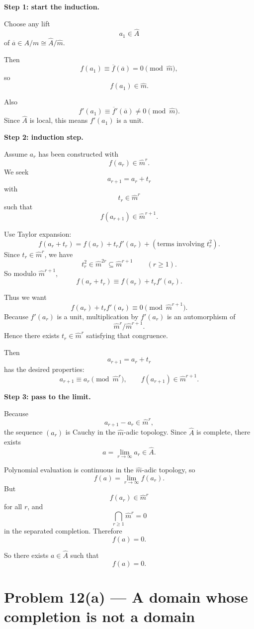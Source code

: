 \documentclass[12pt,a4paper]{article}
\theoremstyle{plain}
\theoremstyle{definition}      %
\begin{document}
	\medskip
	\textbf{Step 1: start the induction.}
	
	Choose any lift
	\[
	a_1\in \widehat A
	\]
	of \(\overline a\in A/m\cong \widehat A/\widehat m\).
	
	Then
	\[
	f(a_1)\equiv \overline f(\overline a)=0 \pmod{\widehat m},
	\]
	so
	\[
	f(a_1)\in \widehat m.
	\]
	
	Also
	\[
	f'(a_1)\equiv \overline f'(\overline a)\neq 0 \pmod{\widehat m}.
	\]
	Since \(\widehat A\) is local, this means \(f'(a_1)\) is a unit.
	
	\medskip
	\textbf{Step 2: induction step.}
	
	Assume \(a_r\) has been constructed with
	\[
	f(a_r)\in \widehat m^r.
	\]
	We seek
	\[
	a_{r+1}=a_r+t_r
	\]
	with
	\[
	t_r\in \widehat m^r
	\]
	such that
	\[
	f(a_{r+1})\in \widehat m^{r+1}.
	\]
	
	Use Taylor expansion:
	\[
	f(a_r+t_r)=f(a_r)+t_r f'(a_r)+(\text{terms involving }t_r^2).
	\]
	Since \(t_r\in \widehat m^r\), we have
	\[
	t_r^2\in \widehat m^{2r}\subseteq \widehat m^{r+1}
	\qquad (r\ge 1).
	\]
	So modulo \(\widehat m^{r+1}\),
	\[
	f(a_r+t_r)\equiv f(a_r)+t_r f'(a_r).
	\]
	
	Thus we want
	\[
	f(a_r)+t_r f'(a_r)\equiv 0 \pmod{\widehat m^{r+1}}.
	\]
	Because \(f'(a_r)\) is a unit, multiplication by \(f'(a_r)\) is an automorphism of
	\[
	\widehat m^r/\widehat m^{r+1}.
	\]
	Hence there exists \(t_r\in \widehat m^r\) satisfying that congruence.
	
	Then
	\[
	a_{r+1}=a_r+t_r
	\]
	has the desired properties:
	\[
	a_{r+1}\equiv a_r \pmod{\widehat m^r},
	\qquad
	f(a_{r+1})\in \widehat m^{r+1}.
	\]
	
	\medskip
	\textbf{Step 3: pass to the limit.}
	
	Because
	\[
	a_{r+1}-a_r\in \widehat m^r,
	\]
	the sequence \((a_r)\) is Cauchy in the \(\widehat m\)-adic topology. Since \(\widehat A\) is complete, there exists
	\[
	a=\lim_{r\to\infty} a_r \in \widehat A.
	\]
	
	Polynomial evaluation is continuous in the \(\widehat m\)-adic topology, so
	\[
	f(a)=\lim_{r\to\infty} f(a_r).
	\]
	But
	\[
	f(a_r)\in \widehat m^r
	\]
	for all \(r\), and
	\[
	\bigcap_{r\ge 1}\widehat m^r=0
	\]
	in the separated completion. Therefore
	\[
	f(a)=0.
	\]
	
	So there exists \(a\in \widehat A\) such that
	\[
	f(a)=0.
	\]
	
	
	
	\section*{Problem 12(a) --- A domain whose completion is not a domain}
	
\end{document}
